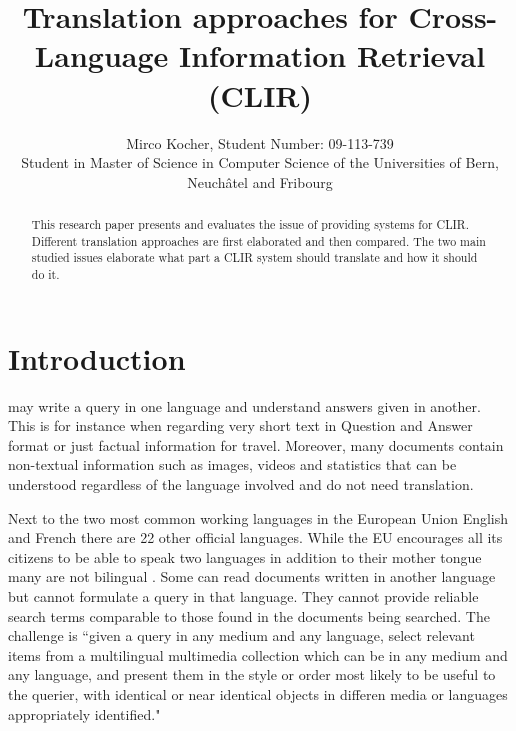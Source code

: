 \documentclass[journal]{IEEEtran}
\begin{document}
\title{ Translation approaches for Cross-Language Information
Retrieval (CLIR)}

\author{Mirco Kocher, Student Number: 09-113-739\\
Student in Master of Science in Computer Science of the Universities of Bern, Neuch\^{a}tel and Fribourg}


\maketitle


\begin{abstract}
This research paper presents and evaluates the issue of providing systems for CLIR.
Different translation approaches are first elaborated and then compared.
The two main studied issues elaborate what part a CLIR system should translate and how it should do it.
\end{abstract}


\section{Introduction}
 may write a query in one language and understand answers given in another.
This is for instance when regarding very short text in Question and Answer format or just factual information for travel.
Moreover, many documents contain non-textual information such as images, videos and statistics that can be understood regardless of the language involved and do not need translation.

Next to the two most common working languages in the European Union English and French there are 22 other official languages.
While the EU encourages all its citizens to be able to speak two languages in addition to their mother tongue many  are not bilingual \cite{ebs386}.
Some can read documents written in another language but cannot formulate a query in that language.
They cannot provide reliable search terms comparable to those found in the documents being searched.
The challenge is ``given a query in any medium and any language, select relevant items from a multilingual multimedia collection which can be in any medium and any language, and present them in the style or order most likely to be useful to the querier, with identical or near identical objects in differen media or languages appropriately identified." \cite{oard97a}
\end{document}
